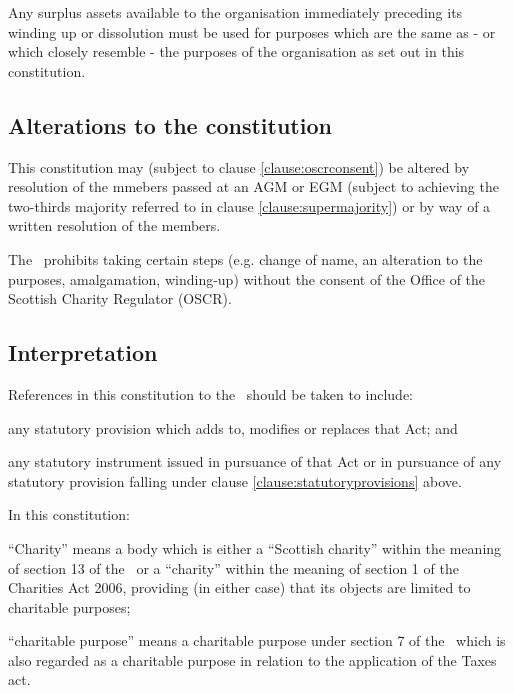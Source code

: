 \documentclass{article}
\begin{document}
\clause Any surplus assets available to the organisation immediately
preceding its winding up or dissolution must be used for purposes
which are the same as - or which closely resemble - the purposes of
the organisation as set out in this constitution.

\subsection{Alterations to the constitution}

\clause This constitution may (subject to clause
\ref{clause:oscrconsent}) be altered by resolution of the mmebers
passed at an AGM or EGM (subject to achieving the two-thirds majority
referred to in clause \ref{clause:supermajority}) or by way of a
written resolution of the members.

\clause\label{clause:oscrconsent}The \charityact\ prohibits taking
certain steps (e.g. change of name, an alteration to the purposes,
amalgamation, winding-up) without the consent of the Office of the
Scottish Charity Regulator (OSCR).

\subsection{Interpretation}

\clause References in this constitution to the \charityact\ should be
taken to include:

\subclause any statutory provision which adds to, modifies or replaces
that Act; and

\subclause any statutory instrument issued in pursuance of that Act or
in pursuance of any statutory provision falling under clause
\ref{clause:statutoryprovisions} above.

\clause In this constitution:

\subclause ``Charity'' means a body which is either a ``Scottish
charity'' within the meaning of section 13 of the \charityact\ or a
``charity'' within the meaning of section 1 of the Charities Act 2006,
providing (in either case) that its objects are limited to charitable
purposes; 

\subclause ``charitable purpose'' means a charitable purpose under
section 7 of the \charityact\ which is also regarded as a charitable
purpose in relation to the application of the Taxes act.
\end{document}
